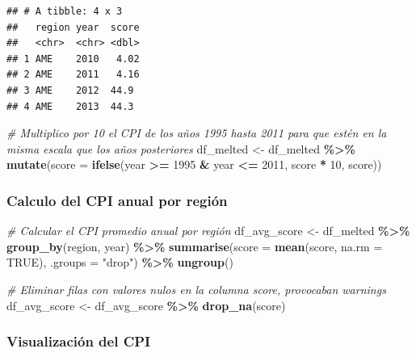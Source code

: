 \documentclass[
]{article}
\newenvironment{Shaded}{\begin{snugshade}}{\end{snugshade}}
\newcommand{\AttributeTok}[1]{\textcolor[rgb]{0.13,0.29,0.53}{#1}}
\newcommand{\CommentTok}[1]{\textcolor[rgb]{0.56,0.35,0.01}{\textit{#1}}}
\newcommand{\ConstantTok}[1]{\textcolor[rgb]{0.56,0.35,0.01}{#1}}
\newcommand{\DecValTok}[1]{\textcolor[rgb]{0.00,0.00,0.81}{#1}}
\newcommand{\FunctionTok}[1]{\textcolor[rgb]{0.13,0.29,0.53}{\textbf{#1}}}
\newcommand{\NormalTok}[1]{#1}
\newcommand{\OtherTok}[1]{\textcolor[rgb]{0.56,0.35,0.01}{#1}}
\newcommand{\SpecialCharTok}[1]{\textcolor[rgb]{0.81,0.36,0.00}{\textbf{#1}}}
\newcommand{\StringTok}[1]{\textcolor[rgb]{0.31,0.60,0.02}{#1}}
\begin{document}
\begin{verbatim}
## # A tibble: 4 x 3
##   region year  score
##   <chr>  <chr> <dbl>
## 1 AME    2010   4.02
## 2 AME    2011   4.16
## 3 AME    2012  44.9 
## 4 AME    2013  44.3
\end{verbatim}

\begin{Shaded}
\begin{Highlighting}[]
\CommentTok{\# Multiplico por 10 el CPI de los años 1995 hasta 2011 para que estén en la misma escala que los años posteriores}
\NormalTok{df\_melted }\OtherTok{\textless{}{-}}\NormalTok{ df\_melted }\SpecialCharTok{\%\textgreater{}\%}
    \FunctionTok{mutate}\NormalTok{(}\AttributeTok{score =} \FunctionTok{ifelse}\NormalTok{(year }\SpecialCharTok{\textgreater{}=} \DecValTok{1995} \SpecialCharTok{\&}\NormalTok{ year }\SpecialCharTok{\textless{}=} \DecValTok{2011}\NormalTok{, score }\SpecialCharTok{*} \DecValTok{10}\NormalTok{, score))}
\end{Highlighting}
\end{Shaded}

\subsubsection{Calculo del CPI anual por
región}\label{calculo-del-cpi-anual-por-region}

\begin{Shaded}
\begin{Highlighting}[]
\CommentTok{\# Calcular el CPI promedio anual por región}
\NormalTok{df\_avg\_score }\OtherTok{\textless{}{-}}\NormalTok{ df\_melted }\SpecialCharTok{\%\textgreater{}\%}
    \FunctionTok{group\_by}\NormalTok{(region, year) }\SpecialCharTok{\%\textgreater{}\%}
    \FunctionTok{summarise}\NormalTok{(}\AttributeTok{score =} \FunctionTok{mean}\NormalTok{(score, }\AttributeTok{na.rm =} \ConstantTok{TRUE}\NormalTok{), }\AttributeTok{.groups =} \StringTok{"drop"}\NormalTok{) }\SpecialCharTok{\%\textgreater{}\%}
    \FunctionTok{ungroup}\NormalTok{()}

\CommentTok{\# Eliminar filas con valores nulos en la columna \textquotesingle{}score\textquotesingle{}, provocaban warnings}
\NormalTok{df\_avg\_score }\OtherTok{\textless{}{-}}\NormalTok{ df\_avg\_score }\SpecialCharTok{\%\textgreater{}\%} \FunctionTok{drop\_na}\NormalTok{(score)   }
\end{Highlighting}
\end{Shaded}

\subsubsection{Visualización del CPI}\label{visualizacion-del-cpi}
\end{document}
